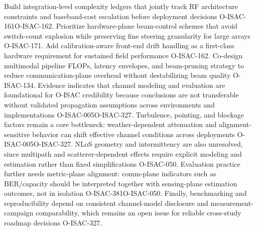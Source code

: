 \markdownRendererInterblockSeparator
{}\markdownRendererUlBeginTight
\markdownRendererUlItem Build integration-level complexity ledgers that jointly track RF architecture constraints and baseband-cost escalation before deployment decisions O-ISAC-161O-ISAC-162.\markdownRendererUlItemEnd 
\markdownRendererUlItem Prioritize hardware-plane beam-control schemes that avoid switch-count explosion while preserving fine steering granularity for large arrays O-ISAC-171.\markdownRendererUlItemEnd 
\markdownRendererUlItem Add calibration-aware front-end drift handling as a first-class hardware requirement for sustained field performance O-ISAC-162.\markdownRendererUlItemEnd 
\markdownRendererUlItem Co-design multimodal pipeline FLOPs, latency envelopes, and beam-pruning strategy to reduce communication-plane overhead without destabilizing beam quality O-ISAC-134.\markdownRendererUlItemEnd 
\markdownRendererUlEndTight \markdownRendererInterblockSeparator
{}
\markdownRendererSectionEnd 
\markdownRendererSectionEnd \markdownRendererSectionBegin
{}\markdownRendererInterblockSeparator
{}\markdownRendererSectionBegin
{}\markdownRendererInterblockSeparator
{}Evidence indicates that channel modeling and evaluation are foundational for O-ISAC credibility because conclusions are not transferable without validated propagation assumptions across environments and implementations O-ISAC-005O-ISAC-327. Turbulence, pointing, and blockage factors remain a core bottleneck: weather-dependent attenuation and alignment-sensitive behavior can shift effective channel conditions across deployments O-ISAC-005O-ISAC-327. NLoS geometry and intermittency are also unresolved, since multipath and scatterer-dependent effects require explicit modeling and estimation rather than fixed simplifications O-ISAC-050. Evaluation practice further needs metric-plane alignment: comm-plane indicators such as BER/capacity should be interpreted together with sensing-plane estimation outcomes, not in isolation O-ISAC-381O-ISAC-050. Finally, benchmarking and reproducibility depend on consistent channel-model disclosure and measurement-campaign comparability, which remains an open issue for reliable cross-study roadmap decisions O-ISAC-327.\markdownRendererInterblockSeparator
{}
\markdownRendererSectionEnd \markdownRendererSectionBegin
{}\markdownRendererInterblockSeparator
